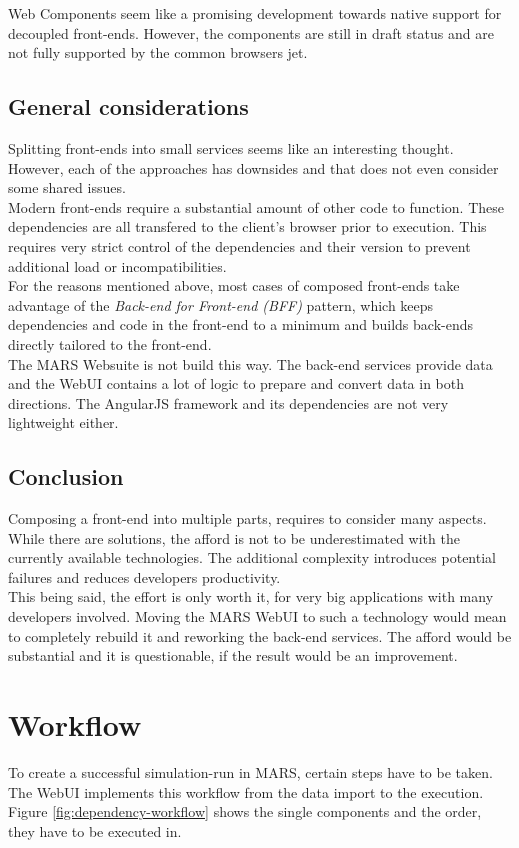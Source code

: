 Web Components seem like a promising development towards native support for decoupled front-ends. However, the components are still in draft status and are not fully supported by the common browsers jet.


\subsection{General considerations}
Splitting front-ends into small services seems like an interesting thought. However, each of the approaches has downsides and that does not even consider some shared issues.\\
Modern front-ends require a substantial amount of other code to function. These dependencies are all transfered to the client's browser prior to execution. This requires very strict control of the dependencies and their version to prevent additional load or incompatibilities.\\
For the reasons mentioned above, most cases of composed front-ends take advantage of the \textit{Back-end for Front-end (BFF)} pattern, which keeps dependencies and code in the front-end to a minimum and builds back-ends directly tailored to the front-end.\\
The MARS Websuite is not build this way. The back-end services provide data and the WebUI contains a lot of logic to prepare and convert data in both directions. The AngularJS framework and its dependencies are not very lightweight either.\\


\subsection{Conclusion}
Composing a front-end into multiple parts, requires to consider many aspects. While there are solutions, the afford is not to be underestimated with the currently available technologies. The additional complexity introduces potential failures and reduces developers productivity.\\
This being said, the effort is only worth it, for very big applications with many developers involved. Moving the MARS WebUI to such a technology would mean to completely rebuild it and reworking the back-end services. The afford would be substantial and it is questionable, if the result would be an improvement.



\section{Workflow}
\label{sec:workflow}
To create a successful simulation-run in MARS, certain steps have to be taken. The WebUI implements this workflow from the data import to the execution. Figure \ref{fig:dependency-workflow} shows the single components and the order, they have to be executed in.

